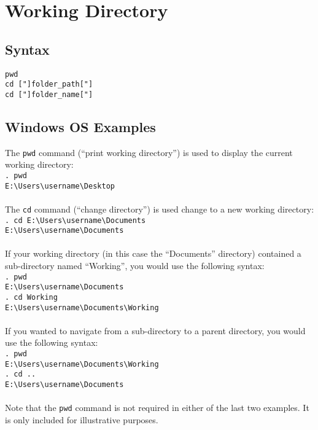 \documentclass[letterpaper,11pt]{article}
\begin{document}
\section{Working Directory}
\subsection{Syntax}
\texttt{{\color{Red}pwd}}\\
\texttt{{\color{Red}cd} ["]folder\_path["]}\\
\texttt{{\color{Red}cd} ["]folder\_name["]}\\

\subsection{Windows OS Examples}
The \texttt{{\color{Red}pwd}} command (``print working directory'') is used to display the current working directory: \\
\texttt{. {\color{Red}pwd}}  \\
\texttt{E:\textbackslash{}Users\textbackslash{}username\textbackslash{}Desktop} \\
\\
The \texttt{{\color{Red}cd}} command (``change directory'') is used change to a new working directory: \\
\texttt{. {\color{Red}cd} E:\textbackslash{}Users\textbackslash{}username\textbackslash{}Documents}  \\
\texttt{E:\textbackslash{}Users\textbackslash{}username\textbackslash{}Documents} \\
\\
If your working directory (in this case the ``Documents'' directory) contained a sub-directory named ``Working'', you would use the following syntax:\\
\texttt{. {\color{Red}pwd}}  \\
\texttt{E:\textbackslash{}Users\textbackslash{}username\textbackslash{}Documents} \\
\texttt{. {\color{Red}cd} Working}  \\
\texttt{E:\textbackslash{}Users\textbackslash{}username\textbackslash{}Documents\textbackslash{}Working} \\
\\
If you wanted to navigate from a sub-directory to a parent directory, you would use the following syntax:\\
\texttt{. {\color{Red}pwd}}  \\
\texttt{E:\textbackslash{}Users\textbackslash{}username\textbackslash{}Documents\textbackslash{}Working} \\
\texttt{. {\color{Red}cd} ..}  \\
\texttt{E:\textbackslash{}Users\textbackslash{}username\textbackslash{}Documents} \\
\\
Note that the \texttt{{\color{Red}pwd}} command is not required in either of the last two examples. It is only included for illustrative purposes.\\
\end{document}
